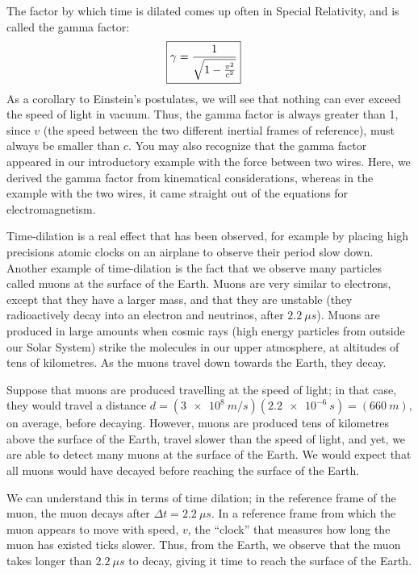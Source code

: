The factor by which time is dilated comes up often in Special Relativity, and is called the gamma factor:
\begin{align*}
\Aboxed{\gamma = \frac{1}{\sqrt{1-\frac{v^2}{c^2}}}}
\end{align*}
As a corollary to Einstein's postulates, we will see that nothing can ever exceed the speed of light in vacuum. Thus, the gamma factor is always greater than 1, since $v$ (the speed between the two different inertial frames of reference), must always be smaller than $c$. You may also recognize that the gamma factor appeared in our introductory example with the force between two wires. Here, we derived the gamma factor from kinematical considerations, whereas in the example with the two wires, it came straight out of the equations for electromagnetism.

Time-dilation is a real effect that has been observed, for example by placing high precisions atomic clocks on an airplane to observe their period slow down. Another example of time-dilation is the fact that we observe many particles called muons at the surface of the Earth. Muons are very similar to electrons, except that they have a larger mass, and that they are unstable (they radioactively decay into an electron and neutrinos, after $\SI{2.2}{\mu s}$). Muons are produced in large amounts when cosmic rays (high energy particles from outside our Solar System) strike the molecules in our upper atmosphere, at altitudes of tens of kilometres. As the muons travel down towards the Earth, they decay.

Suppose that muons are produced travelling at the speed of light; in that case, they would travel a distance $d=(\SI{3e8}{m/s})(\SI{2.2e-6}{s})=(\SI{660}{m})$, on average, before decaying. However, muons are produced tens of kilometres above the surface of the Earth, travel slower than the speed of light, and yet, we are able to detect many muons at the surface of the Earth. We would expect that all muons would have decayed before reaching the surface of the Earth.

We can understand this in terms of time dilation; in the reference frame of the muon, the muon decays after $\Delta t=\SI{2.2}{\mu s}$. In a reference frame from which the muon appears to move with speed, $v$, the ``clock'' that measures how long the muon has existed ticks slower. Thus, from the Earth, we observe that the muon takes longer than $\SI{2.2}{\mu s}$ to decay, giving it time to reach the surface of the Earth.

